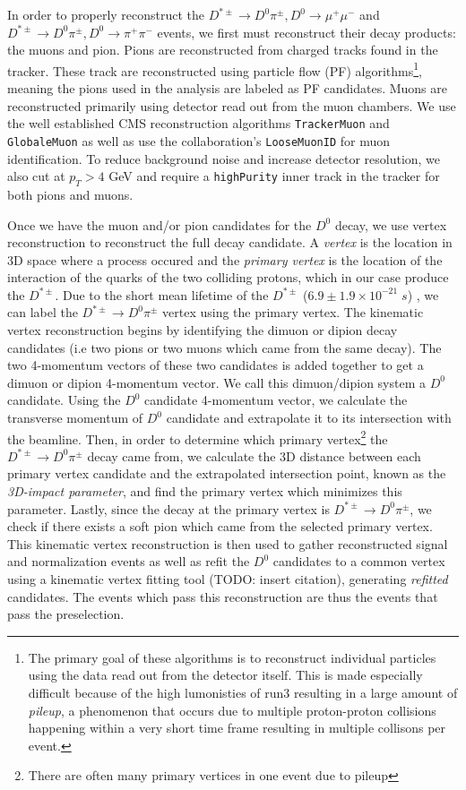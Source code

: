 In order to properly reconstruct the $D^{*\pm} \to D^0 \pi^\pm, D^0 \to \mu^+ \mu^-$ and $D^{*\pm} \to D^0 \pi^\pm, D^0 \to \pi^+ \pi^-$ events, we first must reconstruct their decay products: the muons and pion. Pions are reconstructed from charged tracks found in the tracker. These track are reconstructed using particle flow (PF) algorithms\footnote{The primary goal of these algorithms is to reconstruct individual particles using the data read out from the detector itself. This is made especially difficult because of the high lumonisties of run3 resulting in a large amount of \textit{pileup}, a phenomenon that occurs due to multiple proton-proton collisions happening within a very short time frame resulting in multiple collisons per event. }, meaning the pions used in the analysis are labeled as PF candidates. Muons are reconstructed primarily using detector read out from the muon chambers. We use the well established CMS reconstruction algorithms \texttt{TrackerMuon} and \texttt{GlobaleMuon} as well as use the collaboration's \texttt{LooseMuonID} for muon identification. To reduce background noise and increase detector resolution, we also cut at $p_T>4$ GeV and require a \texttt{highPurity} inner track in the tracker for both pions and muons.

Once we have the muon and/or pion candidates for the $D^0$ decay, we use vertex reconstruction to reconstruct the full decay candidate. A \textit{vertex} is the location in 3D space where a process occured and the \textit{primary vertex} is the location of the interaction of the quarks of the two colliding protons, which in our case produce the $D^{*\pm}$. Due to the short mean lifetime of the $D^{*\pm}$ ($ 6.9 \pm 1.9 \times 10^{-21} \; s$) \cite{ref:pdg2024}, we can label the $D^{*\pm} \to D^0 \pi^\pm$ vertex using the primary vertex. The kinematic vertex reconstruction begins by identifying the dimuon or dipion decay candidates (i.e two pions or two muons which came from the same decay). The two 4-momentum vectors of these two candidates is added together to get a dimuon or dipion 4-momentum vector. We call this dimuon/dipion system a $D^0$ candidate. Using the $D^0$ candidate 4-momentum vector, we calculate the transverse momentum of $D^0$ candidate and extrapolate it to its intersection with the beamline. Then, in order to determine which primary vertex\footnote{There are often many primary vertices in one event due to pileup} the $D^{*\pm} \to D^0 \pi^\pm$ decay came from, we calculate the 3D distance between each primary vertex candidate and the extrapolated intersection point, known as the \textit{3D-impact parameter}, and find the primary vertex which minimizes this parameter. Lastly, since the decay at the primary vertex is $D^{*\pm} \to D^0 \pi^\pm$, we check if there exists a soft pion which came from the selected primary vertex. This kinematic vertex reconstruction is then used to gather reconstructed signal and normalization events as well as refit the $D^0$ candidates to a common vertex using a kinematic vertex fitting tool (TODO: insert citation), generating \textit{refitted} candidates. The events which pass this reconstruction are thus the events that pass the preselection. 

